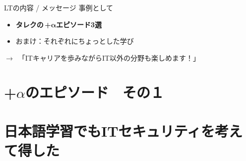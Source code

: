 \documentclass[lualatex,aspectratio=169]{beamer}
\begin{document}
\begin{frame}[t]{LTの内容 / メッセージ}
    事例として
    \begin{itemize}
        \item \textbf{タレクの\,+$\mathbf{\alpha}$エピソード3選}
        \item {\color{gray}おまけ：それぞれにちょっとした学び}
    \end{itemize}
    \vspace{2em}
    $\rightarrow$~「ITキャリアを歩みながらIT以外の分野も楽しめます！」
\end{frame}


\section{+$\alpha$のエピソード　その１}

\section{日本語学習でもITセキュリティを考えて得した}
\end{document}
